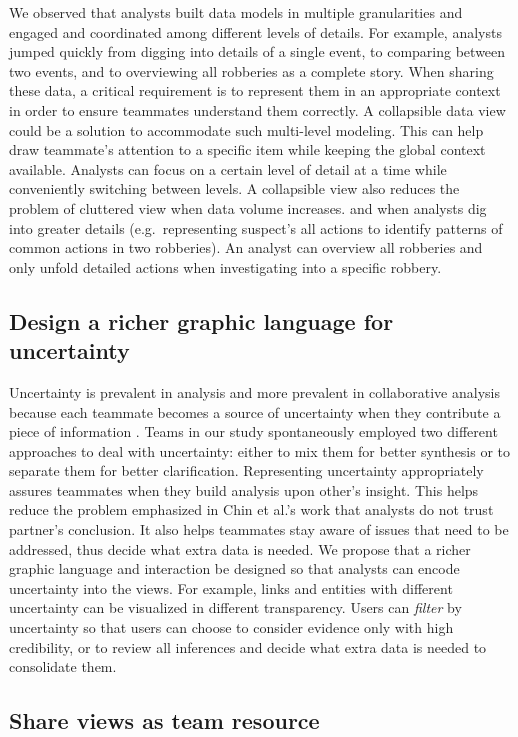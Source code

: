 We observed that analysts built data models in multiple granularities and engaged and coordinated among different levels of details. For example, analysts jumped
quickly from digging into details of a single event, to comparing between two
events, and to overviewing all robberies as a complete story. When sharing these data, a critical requirement is to represent them in an appropriate context in order to ensure teammates understand them correctly. A collapsible data view could be a solution to accommodate such
multi-level modeling. This can help draw teammate's attention to a specific item
while keeping the global context available. Analysts can focus on a certain
level of detail at a time while conveniently switching between levels. A
collapsible view also reduces the problem of cluttered view when data volume
increases.  and when analysts dig into greater
details (e.g.~representing suspect's all actions to identify patterns of common
actions in two robberies). An analyst can overview all robberies and only unfold
detailed actions when investigating into a specific robbery.

\subsection{Design a richer graphic language for uncertainty}

Uncertainty is prevalent in analysis and more prevalent in collaborative
analysis because each teammate becomes a source of uncertainty when they
contribute a piece of information \cite{Chin2009}. Teams in our study
spontaneously employed two different approaches to deal with uncertainty: either
to mix them for better synthesis or to separate them for better clarification.
Representing uncertainty appropriately assures teammates when they build
analysis upon other's insight. This helps reduce the problem emphasized in Chin
et al.'s work \cite{Chin2009} that analysts do not trust partner's conclusion.
It also helps teammates stay aware of issues that need to be addressed, thus
decide what extra data is needed. We propose that a richer graphic language and
interaction be designed so that analysts can encode uncertainty into the views.
For example, links and entities with different uncertainty can be visualized in
different transparency. Users can \emph{filter} by uncertainty so that users can
choose to consider evidence only with high credibility, or to review all
inferences and decide what extra data is needed to consolidate them.

\subsection{Share views as team resource}


